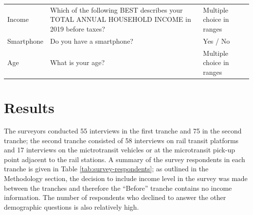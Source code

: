 \documentclass[smartcities,article,submit,moreauthors,pdftex]{Definitions/mdpi}
\begin{document}
\begin{table}[ht]
\begin{tabular}{l p{}p{}}
Income            & Which of the following BEST   describes your TOTAL ANNUAL HOUSEHOLD INCOME in 2019 before taxes? & Multiple choice in ranges                         \\
Smartphone        & Do you have a smartphone?                                                                        & Yes / No                                          \\
Age               & What is your age?                                                                                & Multiple choice in ranges    \\                    
\bottomrule
\end{tabular}
\end{table}

\section{Results}

The surveyors conducted 55 interviews in the first tranche and 75 in the second tranche; the second tranche consisted of 58 interviews on rail transit platforms and 17 interviews on the mictrotransit vehicles or at the microtransit pick-up point adjacent to the rail stations. A summary of the survey respondents in each tranche is given in Table \ref{tab:survey-respondents}; as outlined in the Methodology section, the decision to include income level in the survey was made between the tranches and therefore the “Before” tranche contains no income information. The number of respondents who declined to answer the other demographic questions is also relatively high.
\end{document}
